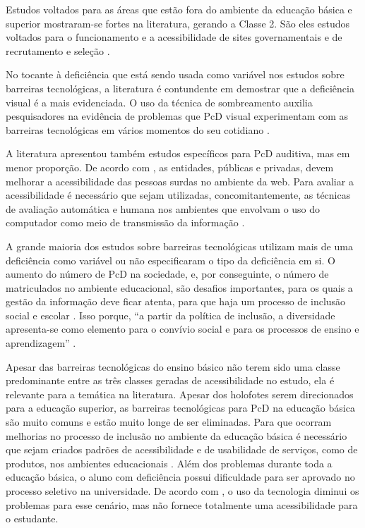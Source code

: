 \documentclass{textolivre}
\begin{document}
Estudos voltados para as áreas que estão fora do ambiente da educação básica e superior mostraram-se fortes na literatura, gerando a Classe 2. São eles estudos voltados para o funcionamento e a acessibilidade de sites governamentais \cite{freire2009, oliveira2013} e de recrutamento e seleção \cite{lima2016}.

No tocante à deficiência que está sendo usada como variável nos estudos sobre barreiras tecnológicas, a literatura é contundente em demostrar que a deficiência visual é a mais evidenciada. O uso da técnica de sombreamento auxilia pesquisadores na evidência de problemas que PcD visual experimentam com as barreiras tecnológicas em vários momentos do seu cotidiano \cite{silva+ferreira2017}.

A literatura apresentou também estudos específicos para PcD auditiva, mas em menor proporção. De acordo com \textcite{flor2013}, as entidades, públicas e privadas, devem melhorar a acessibilidade das pessoas surdas no ambiente da web. Para avaliar a acessibilidade é necessário que sejam utilizadas, concomitantemente, as técnicas de avaliação automática e humana nos ambientes que envolvam o uso do computador como meio de transmissão da informação \cite{pivetta2014}.

A grande maioria dos estudos sobre barreiras tecnológicas utilizam mais de uma deficiência como variável ou não especificaram o tipo da deficiência em si. O aumento do número de PcD na sociedade, e, por conseguinte, o número de matriculados no ambiente educacional, são desafios importantes, para os quais a gestão da informação deve ficar atenta, para que haja um processo de inclusão social e escolar \cite{vianna2017}. Isso porque, “a partir da política de inclusão, a diversidade apresenta-se como elemento para o convívio social e para os processos de ensino e aprendizagem” \cite[p. 560]{kraemer2018}.

Apesar das barreiras tecnológicas do ensino básico não terem sido uma classe predominante entre as três classes geradas de acessibilidade no estudo, ela é relevante para a temática na literatura. Apesar dos holofotes serem direcionados para a educação superior, as barreiras tecnológicas para PcD na educação básica são muito comuns e estão muito longe de ser eliminadas. Para que ocorram melhorias no processo de inclusão no ambiente da educação básica é necessário que sejam criados padrões de acessibilidade e de usabilidade de serviços, como de produtos, nos ambientes educacionais \cite{souza2019}. Além dos problemas durante toda a educação básica, o aluno com deficiência possui dificuldade para ser aprovado no processo seletivo na universidade. De acordo com \textcite{leria2018}, o uso da tecnologia diminui os problemas para esse cenário, mas não fornece totalmente uma acessibilidade para o estudante.
\end{document}
